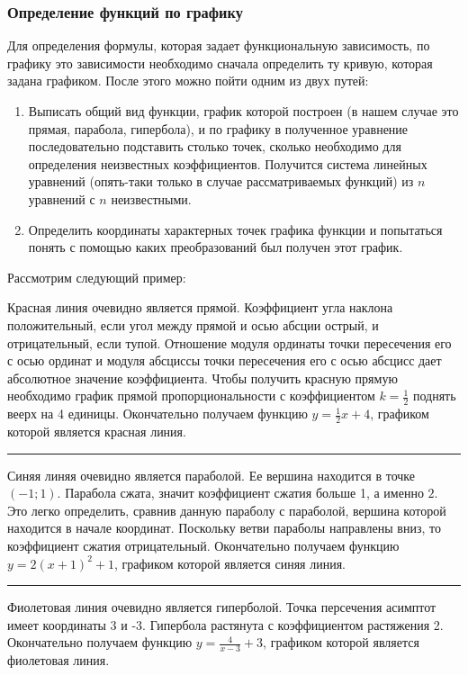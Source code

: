 \documentclass[algebra,twocolumn]{pum}
\date{26.03.20}
\begin{document}
\subsubsection*{Определение функций по графику}
Для определения формулы, которая задает функциональную зависимость, по графику это зависимости необходимо сначала определить ту кривую, которая задана графиком. После этого можно пойти одним из двух путей:
\begin{enumerate}
  \item Выписать общий вид функции, график которой построен (в нашем случае это прямая, парабола, гипербола), и по графику в полученное уравнение последовательно подставить столько точек, сколько необходимо для определения неизвестных коэффициентов. Получится система линейных уравнений (опять-таки только в случае рассматриваемых функций) из $n$ уравнений с $n$ неизвестными. 
  \item Определить координаты характерных точек графика функции и попытаться понять с помощью каких преобразований был получен этот график.
\end{enumerate}

Рассмотрим следующий пример:


  \bigskip
  Красная линия очевидно является прямой. Коэффициент угла наклона положительный, если угол между прямой и осью абсции острый, и отрицательный, если тупой. Отношение модуля ординаты точки пересечения его с осью ординат и модуля абсциссы точки пересечения его с осью абсцисс дает абсолютное значение коэффициента. Чтобы получить красную прямую необходимо график прямой пропорциональности с коэффициентом $k=\frac{1}{2}$ поднять веерх на 4 единицы. Окончательно получаем функцию $y=\frac{1}{2}x+4$, графиком которой является красная линия.
  \bigskip
  \hrule
  \bigskip
  Синяя линяя очевидно является параболой. Ее вершина находится в точке $(-1;1)$.  Парабола сжата, значит коэффициент сжатия больше 1, а именно $2$. Это легко определить, сравнив данную параболу с параболой, вершина которой находится в начале координат. Поскольку ветви параболы направлены вниз, то коэффициент сжатия отрицательный. Окончательно получаем функцию $y=2(x+1)^2+1$, графиком которой является синяя линия.
  \bigskip
  \hrule
  \bigskip
  Фиолетовая линия очевидно является гиперболой. Точка персечения асимптот имеет координаты 3 и -3. Гипербола растянута с коэффициентом растяжения 2. Окончательно получаем функцию $y=\frac{4}{x-3}+3$, графиком которой является фиолетовая линия. 
\end{document}
